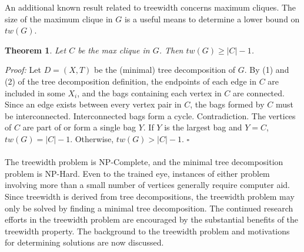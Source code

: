 \documentclass[12pt,conference]{IEEEtran}
\theoremstyle{plain}
\newtheorem{theorem}{Theorem}
\begin{document}
An additional known result related to treewidth concerns maximum cliques. The size of the maximum clique in $G$ is a useful means to determine a lower bound on $tw(G)$.

\begin{theorem}
  Let $C$ be the max clique in $G$. Then $tw(G) \geq |C|-1$.
\end{theorem}

\textit{Proof:} Let $D=(X,T)$ be the (minimal) tree decomposition of $G$. By (1) and (2) of the tree decomposition definition, the endpoints of each edge in $C$ are included in some $X_{i}$, and the bags containing each vertex in $C$ are connected. Since an edge exists between every vertex pair in $C$, the bags formed by $C$ must be interconnected. Interconnected bags form a cycle. Contradiction. The vertices of $C$ are part of or form a single bag $Y$. If $Y$ is the largest bag and $Y=C$, $tw(G)=|C|-1$. Otherwise, $tw(G) > |C|-1$. $\square$
\\
\\
The treewidth problem is NP-Complete, and the minimal tree decomposition problem is NP-Hard. Even to the trained eye, instances of either problem involving more than a small number of vertices generally require computer aid. Since treewidth is derived from tree decompositions, the treewidth problem may only be solved by finding a minimal tree decomposition. The continued research efforts in the treewidth problem are encouraged by the substantial benefits of the treewidth property. The background to the treewidth problem and motivations for determining solutions are now discussed.

\begin{figure}
\begin{center}
\end{center}
\end{figure}
\end{document}
